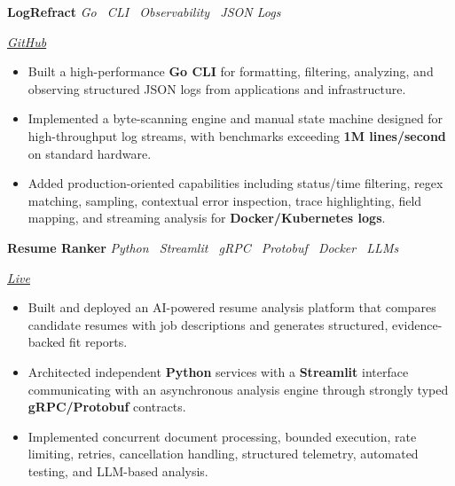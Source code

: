 \documentclass[10pt,a4paper]{article}
\newcommand{\projectentry}[3]{%
    \noindent
    \begin{minipage}[t]{0.62\linewidth}
        \raggedright
        \textbf{#1}
        \hspace{0.7em}
        \textit{\color{textgray}#2}
    \end{minipage}%
    \hfill
    \begin{minipage}[t]{0.34\linewidth}
        \raggedleft
        \itshape\color{textgray}#3
    \end{minipage}%
    \par
}
\begin{document}
\vspace{3pt}

\projectentry
    {LogRefract}
    {Go \textperiodcentered\ CLI \textperiodcentered\ Observability \textperiodcentered\ JSON Logs}
    {\href{https://github.com/Kishan-Thanki/logrefract}{GitHub}}

\vspace{2pt}

\begin{itemize}
    \item Built a high-performance \textbf{Go CLI} for formatting, filtering, analyzing, and observing structured JSON logs from applications and infrastructure.

    \item Implemented a byte-scanning engine and manual state machine designed for high-throughput log streams, with benchmarks exceeding \textbf{1M lines/second} on standard hardware.

    \item Added production-oriented capabilities including status/time filtering, regex matching, sampling, contextual error inspection, trace highlighting, field mapping, and streaming analysis for \textbf{Docker/Kubernetes logs}.
\end{itemize}

\vspace{3pt}

\projectentry
    {Resume Ranker}
    {Python \textperiodcentered\ Streamlit \textperiodcentered\ gRPC \textperiodcentered\ Protobuf \textperiodcentered\ Docker \textperiodcentered\ LLMs}
    {\href{https://resumeranker.kishanthanki.space/}{Live}}

\vspace{2pt}

\begin{itemize}
    \item Built and deployed an AI-powered resume analysis platform that compares candidate resumes with job descriptions and generates structured, evidence-backed fit reports.

    \item Architected independent \textbf{Python} services with a \textbf{Streamlit} interface communicating with an asynchronous analysis engine through strongly typed \textbf{gRPC/Protobuf} contracts.

    \item Implemented concurrent document processing, bounded execution, rate limiting, retries, cancellation handling, structured telemetry, automated testing, and LLM-based analysis.
\end{itemize}
\end{document}
